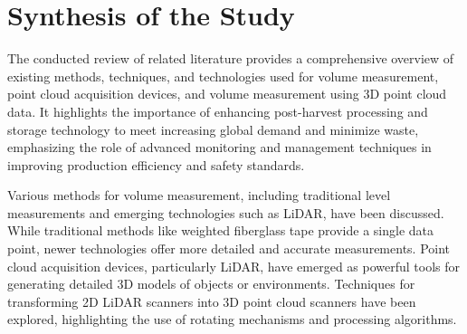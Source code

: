

\section{Synthesis of the Study}

The conducted review of related literature provides a comprehensive overview of existing methods, techniques, and technologies used for volume measurement, point cloud acquisition devices, and volume measurement using 3D point cloud data. It highlights the importance of enhancing post-harvest processing and storage technology to meet increasing global demand and minimize waste, emphasizing the role of advanced monitoring and management techniques in improving production efficiency and safety standards.

Various methods for volume measurement, including traditional level measurements and emerging technologies such as LiDAR, have been discussed. While traditional methods like weighted fiberglass tape provide a single data point, newer technologies offer more detailed and accurate measurements. Point cloud acquisition devices, particularly LiDAR, have emerged as powerful tools for generating detailed 3D models of objects or environments. Techniques for transforming 2D LiDAR scanners into 3D point cloud scanners have been explored, highlighting the use of rotating mechanisms and processing algorithms.

